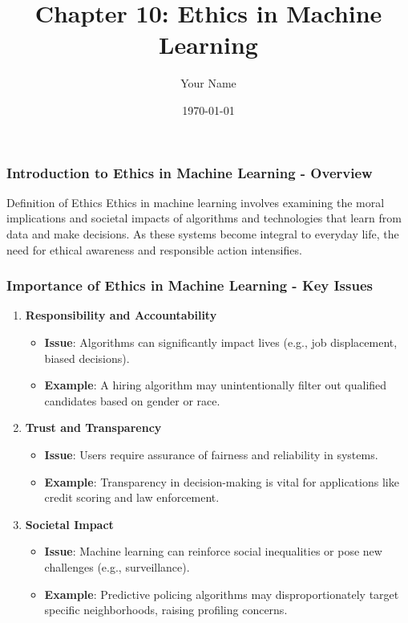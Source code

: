 \documentclass{beamer}
\title{Chapter 10: Ethics in Machine Learning}
\author{Your Name}
\institute{Your Institution}
\date{\today}
\begin{document}
\frame{\titlepage}

\begin{frame}[fragile]
    \frametitle{Introduction to Ethics in Machine Learning - Overview}
    \begin{block}{Definition of Ethics}
        Ethics in machine learning involves examining the moral implications and societal impacts of algorithms and technologies that learn from data and make decisions. As these systems become integral to everyday life, the need for ethical awareness and responsible action intensifies.
    \end{block}
\end{frame}

\begin{frame}[fragile]
    \frametitle{Importance of Ethics in Machine Learning - Key Issues}
    \begin{enumerate}
        \item \textbf{Responsibility and Accountability}
            \begin{itemize}
                \item \textbf{Issue}: Algorithms can significantly impact lives (e.g., job displacement, biased decisions).
                \item \textbf{Example}: A hiring algorithm may unintentionally filter out qualified candidates based on gender or race.
            \end{itemize}

        \item \textbf{Trust and Transparency}
            \begin{itemize}
                \item \textbf{Issue}: Users require assurance of fairness and reliability in systems.
                \item \textbf{Example}: Transparency in decision-making is vital for applications like credit scoring and law enforcement.
            \end{itemize}

        \item \textbf{Societal Impact}
            \begin{itemize}
                \item \textbf{Issue}: Machine learning can reinforce social inequalities or pose new challenges (e.g., surveillance).
                \item \textbf{Example}: Predictive policing algorithms may disproportionately target specific neighborhoods, raising profiling concerns.
            \end{itemize}


\end{enumerate}
\end{frame}
\end{document}
